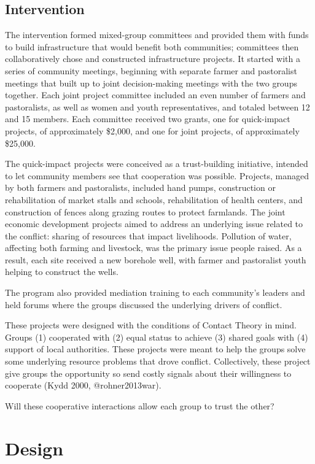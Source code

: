 \documentclass[11pt]{article}
\begin{document}
\hypertarget{intervention}{%
\subsection{Intervention}\label{intervention}}

The intervention formed mixed-group committees and provided them with
funds to build infrastructure that would benefit both communities;
committees then collaboratively chose and constructed infrastructure
projects. It started with a series of community meetings, beginning with
separate farmer and pastoralist meetings that built up to joint
decision-making meetings with the two groups together. Each joint
project committee included an even number of farmers and pastoralists,
as well as women and youth representatives, and totaled between 12 and
15 members. Each committee received two grants, one for quick-impact
projects, of approximately \$2,000, and one for joint projects, of
approximately \$25,000.

The quick-impact projects were conceived as a trust-building initiative,
intended to let community members see that cooperation was possible.
Projects, managed by both farmers and pastoralists, included hand pumps,
construction or rehabilitation of market stalls and schools,
rehabilitation of health centers, and construction of fences along
grazing routes to protect farmlands. The joint economic development
projects aimed to address an underlying issue related to the conflict:
sharing of resources that impact livelihoods. Pollution of water,
affecting both farming and livestock, was the primary issue people
raised. As a result, each site received a new borehole well, with farmer
and pastoralist youth helping to construct the wells.

The program also provided mediation training to each community's leaders
and held forums where the groups discussed the underlying drivers of
conflict.

These projects were designed with the conditions of Contact Theory in
mind. Groups (1) cooperated with (2) equal status to achieve (3) shared
goals with (4) support of local authorities. These projects were meant
to help the groups solve some underlying resource problems that drove
conflict. Collectively, these project give groups the opportunity so
send costly signals about their willingness to cooperate (Kydd 2000,
@rohner2013war).

Will these cooperative interactions allow each group to trust the other?

\hypertarget{design}{%
\section{Design}\label{design}}
\end{document}
